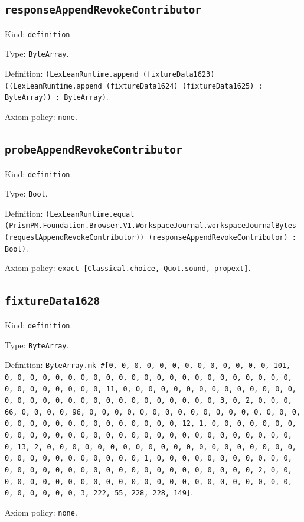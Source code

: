 \documentclass[11pt]{article}
\begin{document}
\subsection*{\texttt{responseAppendRevokeContributor}}
\noindent Kind: \texttt{definition}.\par
\noindent Type: \texttt{ByteArray}.\par
\noindent Definition: \texttt{(LexLeanRuntime.append (fixtureData1623) ((LexLeanRuntime.append (fixtureData1624) (fixtureData1625) : ByteArray)) : ByteArray)}.\par
\noindent Axiom policy: \texttt{none}.\par
\subsection*{\texttt{probeAppendRevokeContributor}}
\noindent Kind: \texttt{definition}.\par
\noindent Type: \texttt{Bool}.\par
\noindent Definition: \texttt{(LexLeanRuntime.equal (PrismPM.Foundation.Browser.V1.WorkspaceJournal.workspaceJournalBytes (requestAppendRevokeContributor)) (responseAppendRevokeContributor) : Bool)}.\par
\noindent Axiom policy: \texttt{exact [Classical.choice, Quot.sound, propext]}.\par
\subsection*{\texttt{fixtureData1628}}
\noindent Kind: \texttt{definition}.\par
\noindent Type: \texttt{ByteArray}.\par
\noindent Definition: \texttt{ByteArray.mk \#[0, 0, 0, 0, 0, 0, 0, 0, 0, 0, 0, 0, 0, 101, 0, 0, 0, 0, 0, 0, 0, 0, 0, 0, 0, 0, 0, 0, 0, 0, 0, 0, 0, 0, 0, 0, 0, 0, 0, 0, 0, 0, 0, 0, 0, 11, 0, 0, 0, 0, 0, 0, 0, 0, 0, 0, 0, 0, 0, 0, 0, 0, 0, 0, 0, 0, 0, 0, 0, 0, 0, 0, 0, 0, 0, 0, 0, 3, 0, 2, 0, 0, 0, 66, 0, 0, 0, 0, 96, 0, 0, 0, 0, 0, 0, 0, 0, 0, 0, 0, 0, 0, 0, 0, 0, 0, 0, 0, 0, 0, 0, 0, 0, 0, 0, 0, 0, 0, 0, 0, 12, 1, 0, 0, 0, 0, 0, 0, 0, 0, 0, 0, 0, 0, 0, 0, 0, 0, 0, 0, 0, 0, 0, 0, 0, 0, 0, 0, 0, 0, 0, 0, 0, 13, 2, 0, 0, 0, 0, 0, 0, 0, 0, 0, 0, 0, 0, 0, 0, 0, 0, 0, 0, 0, 0, 0, 0, 0, 0, 0, 0, 0, 0, 0, 0, 0, 1, 0, 0, 0, 0, 0, 0, 0, 0, 0, 0, 0, 0, 0, 0, 0, 0, 0, 0, 0, 0, 0, 0, 0, 0, 0, 0, 0, 0, 0, 0, 0, 2, 0, 0, 0, 0, 0, 0, 0, 0, 0, 0, 0, 0, 0, 0, 0, 0, 0, 0, 0, 0, 0, 0, 0, 0, 0, 0, 0, 0, 0, 0, 0, 3, 222, 55, 228, 228, 149]}.\par
\noindent Axiom policy: \texttt{none}.\par
\end{document}
